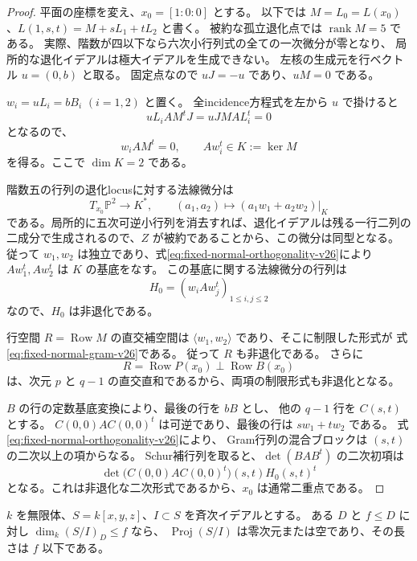 \begin{proof}
平面の座標を変え、$x_0=[1:0:0]$ とする。
以下では $M=L_0=L(x_0)$、$L(1,s,t)=M+sL_1+tL_2$ と書く。
被約な孤立退化点では $\operatorname{rank}M=5$ である。
実際、階数が四以下なら六次小行列式の全ての一次微分が零となり、
局所的な退化イデアルは極大イデアルを生成できない。
左核の生成元を行ベクトル $u=(0,b)$ と取る。
固定点なので $uJ=-u$ であり、$uM=0$ である。

$w_i=uL_i=bB_i$ $(i=1,2)$ と置く。
全incidence方程式を左から $u$ で掛けると
\[
 uL_iAM^tJ=uJMAL_i^t=0
\]
となるので、
\begin{equation}\label{eq:fixed-normal-orthogonality-v26}
 w_iAM^t=0,\qquad Aw_i^t\in K:=\ker M
\end{equation}
を得る。ここで $\dim K=2$ である。

階数五の行列の退化locusに対する法線微分は
\[
 T_{x_0}\mathbb P^2\longrightarrow K^*,\qquad
 (a_1,a_2)\longmapsto (a_1w_1+a_2w_2)|_K
\]
である。局所的に五次可逆小行列を消去すれば、退化イデアルは残る一行二列の
二成分で生成されるので、$Z$ が被約であることから、この微分は同型となる。
従って $w_1,w_2$ は独立であり、式\eqref{eq:fixed-normal-orthogonality-v26}により
$Aw_1^t,Aw_2^t$ は $K$ の基底をなす。
この基底に関する法線微分の行列は
\begin{equation}\label{eq:fixed-normal-gram-v26}
 H_0=(w_iAw_j^t)_{1\leq i,j\leq2}
\end{equation}
なので、$H_0$ は非退化である。

行空間 $R=\operatorname{Row}M$ の直交補空間は
$\langle w_1,w_2\rangle$ であり、そこに制限した形式が
式\eqref{eq:fixed-normal-gram-v26}である。
従って $R$ も非退化である。
さらに
\[
 R=\operatorname{Row}P(x_0)\mathbin{\perp}\operatorname{Row}B(x_0)
\]
は、次元 $p$ と $q-1$ の直交直和であるから、両項の制限形式も非退化となる。

$B$ の行の定数基底変換により、最後の行を $bB$ とし、
他の $q-1$ 行を $C(s,t)$ とする。
$C(0,0)AC(0,0)^t$ は可逆であり、最後の行は $sw_1+tw_2$ である。
式\eqref{eq:fixed-normal-orthogonality-v26}により、
Gram行列の混合ブロックは $(s,t)$ の二次以上の項からなる。
Schur補行列を取ると、$\det(BAB^t)$ の二次初項は
\[
 \det\bigl(C(0,0)AC(0,0)^t\bigr)
 (s,t)H_0(s,t)^t
\]
となる。これは非退化な二次形式であるから、$x_0$ は通常二重点である。
\end{proof}

\begin{lemma}[一つの次数による射影的な長さの上界]
\label{lem:jacobian-length-bound-v26}
$k$ を無限体、$S=k[x,y,z]$、$I\subset S$ を斉次イデアルとする。
ある $D$ と $f\leq D$ に対し $\dim_k(S/I)_D\leq f$ なら、
$\operatorname{Proj}(S/I)$ は零次元または空であり、その長さは $f$ 以下である。
\end{lemma}

